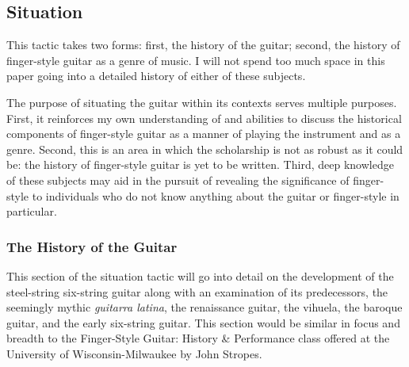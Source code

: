 \documentclass[12pt]{article}
\begin{document}
\subsection{Situation}
\label{sec:situation}
This tactic takes two forms: first, the history of the guitar; second,
the history of finger-style guitar as a genre of music. I will not
spend too much space in this paper going into a detailed history of
either of these subjects.

The purpose of situating the guitar within its contexts serves
multiple purposes. First, it reinforces my own understanding of and
abilities to discuss the historical components of finger-style guitar
as a manner of playing the instrument and as a genre. Second, this is
an area in which the scholarship is not as robust as it could be: the
history of finger-style guitar is yet to be written. Third, deep
knowledge of these subjects may aid in the pursuit of revealing the
significance of finger-style to individuals who do not know anything
about the guitar or finger-style in particular.

\subsubsection{The History of the Guitar}
\label{sec:history-guitar}
This section of the situation tactic will go into detail on the
development of the steel-string six-string guitar along with an
examination of its predecessors, the seemingly mythic \emph{guitarra
  latina}, the renaissance guitar, the vihuela, the baroque guitar,
and the early six-string guitar. This section would be similar in
focus and breadth to the Finger-Style Guitar: History \& Performance
class offered at the University of Wisconsin-Milwaukee by John
Stropes.
\end{document}
